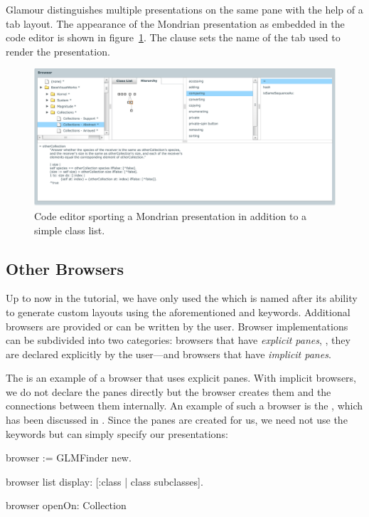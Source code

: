 \documentclass[a4paper,10pt,twoside]{book}
\begin{document}
Glamour distinguishes multiple presentations on the same pane with the
help of a tab layout. The appearance of the Mondrian presentation as
embedded in the code editor is shown in
figure~\ref{fig:mondrian-presentation}. The clause  sets
the name of the tab used to render the presentation.

\begin{figure}[htbp]
\centerline{\includegraphics[width=\linewidth]{mondrian-presentation.pdf}}
\caption{Code editor sporting a Mondrian presentation in addition to a simple class list.}
\label{fig:mondrian-presentation}
\end{figure}


\subsection{Other Browsers}

Up to now in the tutorial, we have only used the 
which is named after its ability to generate custom layouts using the
aforementioned  and  keywords. Additional
browsers are provided or can be written by the user. Browser
implementations can be subdivided into two categories: browsers that
have \emph{explicit panes}, \ie{}, they are declared explicitly by the
user---and browsers that have \emph{implicit panes}.

The  is an example of a browser that uses explicit
panes. With implicit browsers, we do not declare the panes directly
but the browser creates them and the connections between them
internally. An example of such a browser is the , which has
been discussed in . Since the panes are
created for us, we need not use the  keywords but can
simply specify our presentations:

\begin{code}{}
browser := GLMFinder new.

browser list
  display: [:class | class subclasses].

browser openOn: Collection
\end{code}
\end{document}
